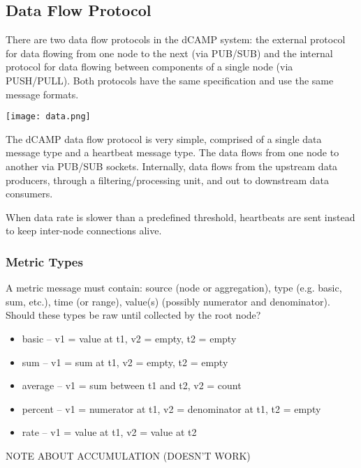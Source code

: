 \subsection{Data Flow Protocol}

There are two data flow protocols in the dCAMP system: the external protocol for data flowing from one node to the next
(via PUB/SUB) and the internal protocol for data flowing between components of a single node (via PUSH/PULL). Both
protocols have the same specification and use the same message formats.

\texttt{[image: data.png]}

The dCAMP data flow protocol is very simple, comprised of a single data message type and a heartbeat message type. The
data flows from one node to another via PUB/SUB sockets. Internally, data flows from the upstream data producers,
through a filtering/processing unit, and out to downstream data consumers.

When data rate is slower than a predefined threshold, heartbeats are sent instead to keep inter-node connections alive.

\subsubsection{Metric Types}

A metric message must contain: source (node or aggregation), type (e.g. basic, sum, etc.), time (or range), value(s)
(possibly numerator and denominator). Should these types be raw until collected by the root node?

\begin{itemize}
\item basic -- v1 = value at t1, v2 = empty, t2 = empty
\item sum -- v1 = sum at t1, v2 = empty, t2 = empty
\item average -- v1 = sum between t1 and t2, v2 = count
\item percent -- v1 = numerator at t1, v2 = denominator at t1, t2 = empty
\item rate -- v1 = value at t1, v2 = value at t2
\end{itemize}

NOTE ABOUT ACCUMULATION (DOESN'T WORK)

